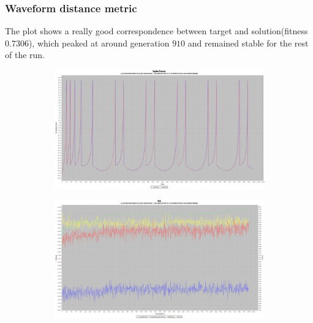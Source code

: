 \documentclass[10pt]{article}
\begin{document}
		\subsubsection{Waveform distance metric}
			The plot shows a really good correspondence between target and solution(fitness $0.7306$), which peaked at around generation $910$ and remained stable for the rest of the run.
			\begin{figure}[H]
				\centering
					\begin{subfigure}{.5\textwidth}
						\centering
						\includegraphics[width=\linewidth]{./../images/izzy2/wave/plot.png}

						\label{fig:sub6a}
					\end{subfigure}%
					\begin{subfigure}{.5\textwidth}
						\centering
						\includegraphics[width=\linewidth]{./../images/izzy2/wave/prog.png}
						
						\label{fig:sub6b}
					\end{subfigure}
					
					\label{fig:plot6}
			\end{figure}
\end{document}
